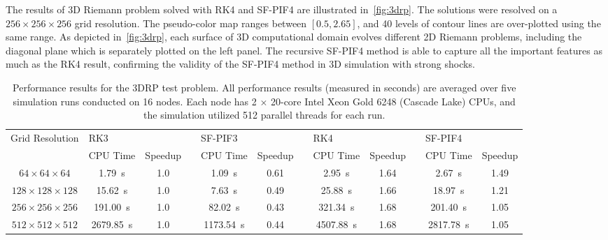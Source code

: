 The results of 3D Riemann problem solved with RK4 and SF-PIF4 are
illustrated in~\cref{fig:3drp}. The solutions were resolved on a
\( 256 \times 256 \times 256 \) grid resolution.
The pseudo-color map ranges between \( [0.5, 2.65] \),
and 40 levels of contour lines are over-plotted using the same range.
As depicted in~\cref{fig:3drp}, each surface of 3D computational domain
evolves different 2D Riemann problems, including the diagonal plane which is
separately plotted on the left panel.
The recursive SF-PIF4 method is able to capture all the important features as much as the RK4 result,
confirming the validity of the SF-PIF4 method in 3D simulation with strong shocks.

\begin{table}
    \footnotesize
    \centering
    \caption{Performance results for the 3DRP test problem.
        All performance results (measured in seconds) are averaged over
        five simulation runs conducted on 16 nodes.%
        Each node has 2 \( \times \) 20-core Intel Xeon Gold 6248 (Cascade Lake) CPUs,
        and the simulation utilized 512 parallel threads for each run.
    }\label{table:3drp}
    \begin{adjustbox}{width=\textwidth}
        \begin{tabular}{@{}cccccccccccc@{}}
            \toprule
            \multirow{2}{*}{Grid Resolution} & \multicolumn{2}{l}{RK3} &  & \multicolumn{2}{l}{SF-PIF3}
                    & & \multicolumn{2}{l}{RK4} & & \multicolumn{2}{l}{SF-PIF4} \\
            \cmidrule(lr){2-3} \cmidrule(l){5-6} \cmidrule(l){8-9} \cmidrule(l){11-12}
            & CPU Time & Speedup &  & CPU Time & Speedup & & CPU Time & Speedup & & CPU Time & Speedup\\
            \midrule
            \( 64 \times 64 \times 64 \)   & \SI{1.79}{\second} & 1.0 &  & \SI{1.09}{\second} & 0.61 & &
                \SI{2.95}{\second} & 1.64 &  & \SI{2.67}{\second} & 1.49 \\
            \( 128 \times 128 \times 128 \) & \SI{15.62}{\second} & 1.0 &  & \SI{7.63}{\second} & 0.49 & &
                \SI{25.88}{\second} & 1.66 &  & \SI{18.97}{\second} & 1.21 \\
            \( 256 \times 256 \times 256 \) & \SI{191.00}{\second}   & 1.0 &  & \SI{82.02}{\second} & 0.43 & &
                \SI{321.34}{\second} & 1.68 &  & \SI{201.40}{\second} & 1.05 \\
            \( 512 \times 512 \times 512 \) & \SI{2679.85}{\second}  & 1.0 &  & \SI{1173.54}{\second} & 0.44 & &
                \SI{4507.88}{\second} & 1.68 &  & \SI{2817.78}{\second} & 1.05 \\
        \end{tabular}
    \end{adjustbox}
\end{table}

